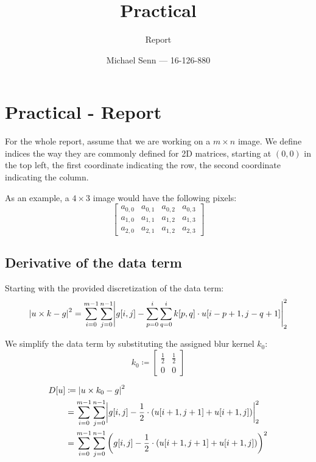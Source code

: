 \documentclass[a4paper]{scrreprt}
\title{Practical \series}
\subtitle{Report}
\author{Michael Senn \maillink{michael.senn@students.unibe.ch} --- 16-126-880}
\date{\printdate}
\DeclarePairedDelimiter\abs{\lvert}{\rvert}
\newcommand{\series}{01}
\begin{document}
\maketitle


\setcounter{chapter}{\numexpr \series - 1 \relax}

\chapter{Practical - Report}

For the whole report, assume that we are working on a $m \times n$ image. We
define indices the way they are commonly defined for 2D matrices, starting at
$(0, 0)$ in the top left, the first coordinate indicating the row, the second
coordinate indicating the column.

As an example, a $4 \times 3$ image would have the following pixels:
\[
		\begin{bmatrix}
				a_{0, 0} & a_{0, 1} & a_{0, 2} & a_{0, 3} \\
				a_{1, 0} & a_{1, 1} & a_{1, 2} & a_{1, 3} \\
				a_{2, 0} & a_{2, 1} & a_{1, 2} & a_{2, 3}
		\end{bmatrix}
\]

\section{Derivative of the data term}

Starting with the provided discretization of the data term:
\[
		\abs*{u \times k - g}^2 = \sum_{i=0}^{m-1} \sum_{j=0}^{n-1} \abs*{g[i, j] - \sum_{p=0}^{i} \sum_{q=0}^{i} k[p, q] \cdot u[i - p + 1, j - q + 1]}_2^2
\]

We simplify the data term by substituting the assigned blur kernel $k_0$:
\[
		k_0 \coloneqq \begin{bmatrix}
				\frac{1}{2} & \frac{1}{2} \\
				0 & 0
		\end{bmatrix}
\]

\begin{align*}
		D[u] & \coloneqq \abs*{u \times k_0 - g}^2 \\ 
			 & = \sum_{i=0}^{m-1} \sum_{j=0}^{n-1} \abs*{g[i, j] - \frac{1}{2} \cdot (u[i + 1, j + 1] + u[i + 1, j])}_2^2 \\
			 & = \sum_{i=0}^{m-1} \sum_{j=0}^{n-1} \left(g[i, j] - \frac{1}{2} \cdot (u[i + 1, j + 1] + u[i + 1, j])\right)^2
\end{align*}
\end{document}
